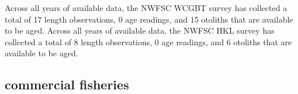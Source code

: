 \documentclass[11pt,
  english,
  letterpaper,
]{article}
\begin{document}
Across all years of available data, the NWFSC WCGBT survey has collected a total of 17 length observations, 0 age readings, and 15 otoliths that are available to be aged. Across all years of available data, the NWFSC HKL survey has collected a total of 8 length observations, 0 age readings, and 6 otoliths that are available to be aged.

\leavevmode\tagmcend\tagstructend\par


\hypertarget{commercial-fisheries-22}{%
\subsection{commercial fisheries}\label{commercial-fisheries-22}}

\leavevmode\tagmcend\tagstructend


\begingroup\fontsize{10}{12}\selectfont \begingroup\fontsize{10}{12}\selectfont

\leavevmode\tagmcend\tagstructend\par
\end{document}
